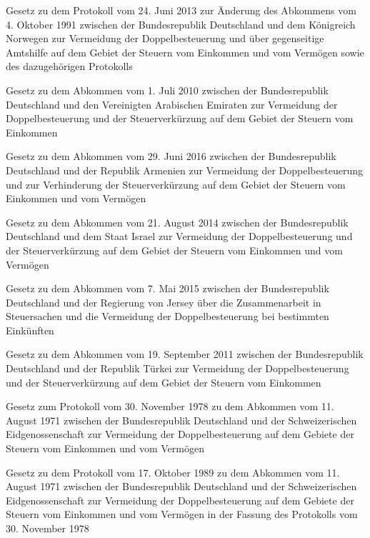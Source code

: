 \item[{DBAÄndProtG-NOR}] Gesetz zu dem Protokoll vom 24. Juni 2013 zur Änderung des Abkommens vom 4. Oktober 1991 zwischen der Bundesrepublik Deutschland und dem Königreich Norwegen zur Vermeidung der Doppelbesteuerung und über gegenseitige Amtshilfe auf dem Gebiet der Steuern vom Einkommen und vom Vermögen sowie des dazugehörigen Protokolls

\item[{DBAAREG}] Gesetz zu dem Abkommen vom 1. Juli 2010 zwischen der Bundesrepublik Deutschland und den Vereinigten Arabischen Emiraten zur Vermeidung der Doppelbesteuerung und der Steuerverkürzung auf dem Gebiet der Steuern vom Einkommen

\item[{DBAbkG-ARM}] Gesetz zu dem Abkommen vom 29. Juni 2016 zwischen der Bundesrepublik Deutschland und der Republik Armenien zur Vermeidung der Doppelbesteuerung und zur Verhinderung der Steuerverkürzung auf dem Gebiet der Steuern vom Einkommen und vom Vermögen

\item[{DBAbkG-ISR-2015}] Gesetz zu dem Abkommen vom 21. August 2014 zwischen der Bundesrepublik Deutschland und dem Staat Israel zur Vermeidung der Doppelbesteuerung und der Steuerverkürzung auf dem Gebiet der Steuern vom Einkommen und vom Vermögen

\item[{DBAbkG-Jersey-2015}] Gesetz zu dem Abkommen vom 7. Mai 2015 zwischen der Bundesrepublik Deutschland und der Regierung von Jersey über die Zusammenarbeit in Steuersachen und die Vermeidung der Doppelbesteuerung bei bestimmten Einkünften

\item[{DBAbkG-TUR}] Gesetz zu dem Abkommen vom 19. September 2011 zwischen der Bundesrepublik Deutschland und der Republik Türkei zur Vermeidung der Doppelbesteuerung und der Steuerverkürzung auf dem Gebiet der Steuern vom Einkommen

\item[{DBACHE1971Prot1978G}] Gesetz zum Protokoll vom 30. November 1978 zu dem Abkommen vom 11. August 1971 zwischen der Bundesrepublik Deutschland und der Schweizerischen Eidgenossenschaft zur Vermeidung der Doppelbesteuerung auf dem Gebiete der Steuern vom Einkommen und vom Vermögen

\item[{DBACHE1971Prot1989G}] Gesetz zu dem Protokoll vom 17. Oktober 1989 zu dem Abkommen vom 11. August 1971 zwischen der Bundesrepublik Deutschland und der Schweizerischen Eidgenossenschaft zur Vermeidung der Doppelbesteuerung auf dem Gebiete der Steuern vom Einkommen und vom Vermögen in der Fassung des Protokolls vom 30. November 1978

